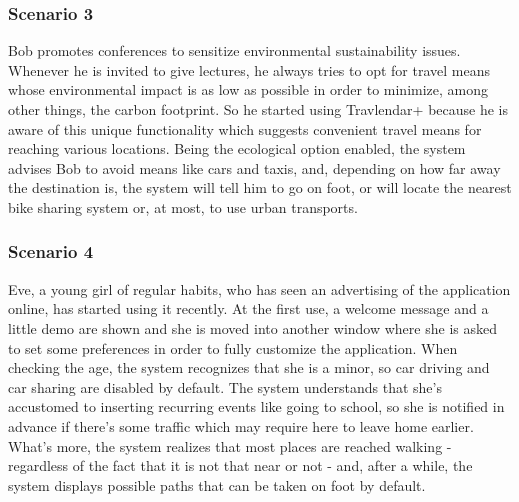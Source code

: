 \subsubsection{Scenario 3}
Bob promotes conferences to sensitize environmental sustainability issues. Whenever he is invited to give lectures, he always tries to opt for travel means whose environmental impact is as low as possible in order to minimize, among other things, the carbon footprint. So he started using Travlendar+ because he is aware of this unique functionality which suggests convenient travel means for reaching various locations. Being the ecological option enabled, the system advises Bob to avoid means like cars and taxis, and, depending on how far away the destination is, the system will tell him to go on foot, or will locate the nearest bike sharing system or, at most, to use urban transports.
\subsubsection{Scenario 4}
Eve, a young girl of regular habits, who has seen an advertising of the application online, has started using it recently. At the first use, a welcome message and a little demo are shown and she is moved into another window where she is asked to set some preferences in order to fully customize the application. When checking the age, the system recognizes that she is a minor, so car driving and car sharing are disabled by default. The system understands that she's accustomed to inserting recurring events like going to school, so she is notified in advance if there's some traffic which may require here to leave home earlier. What's more, the system realizes that most places are reached walking - regardless of the fact that it is not that near or not - and, after a while, the system displays possible paths that can be taken on foot by default.

